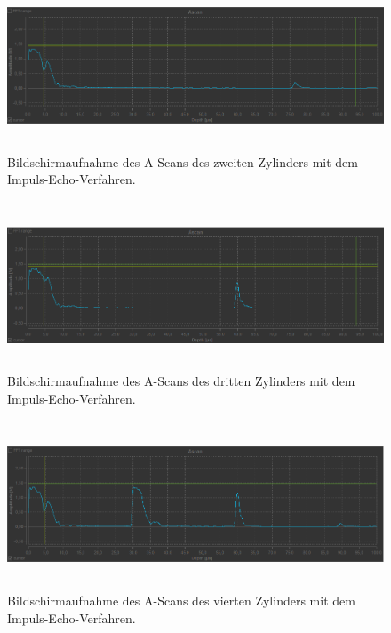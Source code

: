 \begin{figure}
    \centering
    \includegraphics[width=15cm, height=5cm]{build/Messung1.2.png}
    \caption{Bildschirmaufnahme des A-Scans des zweiten Zylinders mit dem Impuls-Echo-Verfahren.}
    \label{m1.2}
\end{figure}

\begin{figure}
    \centering
    \includegraphics[width=15cm, height=5cm]{build/Messung1.3.png}
    \caption{Bildschirmaufnahme des A-Scans des dritten Zylinders mit dem Impuls-Echo-Verfahren.}
    \label{m1.3}
\end{figure}

\begin{figure}
    \centering
    \includegraphics[width=15cm, height=5cm]{build/Messung1.4.png}
    \caption{Bildschirmaufnahme des A-Scans des vierten Zylinders mit dem Impuls-Echo-Verfahren.}
    \label{m1.4}
\end{figure}

